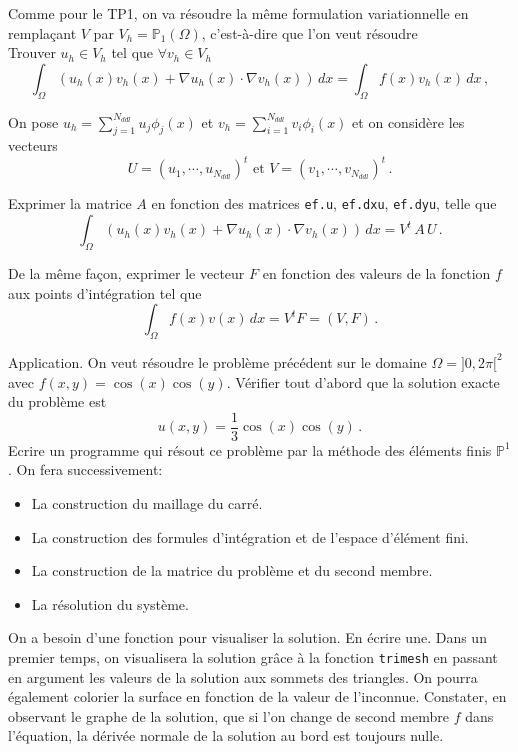 \documentclass[a4paper,french,sumlimits,12pt]{article}
\begin{document}
Comme pour le TP1, on va résoudre la même formulation variationnelle en remplaçant $V$ par $V_h = \mathbb{P}_1(\Omega)$, c'est-à-dire que l'on veut résoudre\\
Trouver $u_h \in V_h$ tel que $\forall v_h \in V_h$
$$
\int_{\Omega} \left(u_h(x)v_h(x)+\nabla u_h(x)\cdot \nabla v_h(x)\right)\,dx = \int_\Omega f(x)v_h(x)\,dx\,,
$$ 

On pose $u_h = \sum_{j=1}^{N_{ddl}} u_j \phi_j(x)$ et $v_h = \sum_{i=1}^{N_{ddl}} v_i \phi_i(x)$ et on considère les vecteurs
$$
U = (u_1,\cdots,u_{N_{ddl}})^t\mbox{ et }V = (v_1,\cdots,v_{N_{ddl}})^t\,.
$$

 Exprimer la matrice $A$ en fonction des matrices {\tt ef.u}, {\tt ef.dxu}, {\tt ef.dyu}, telle que
$$
\int_{\Omega} \left(u_h(x)v_h(x)+\nabla u_h(x)\cdot \nabla v_h(x)\right)\,dx = V^t \,A\,U\,.
$$

 De la même façon, exprimer le vecteur $F$ en fonction des valeurs de la fonction $f$ aux points d'intégration tel que
$$
\int_{\Omega} f(x)v(x)\,dx = V^t F = (V,F)\,.
$$

Application. On veut résoudre le problème précédent sur le domaine $\Omega = ]0,2\pi[^2$ avec $f(x,y) = \cos(x)\cos(y)$. Vérifier tout d'abord que la solution exacte du problème est
$$
u(x,y) = \frac13 \cos(x)\cos(y)\,.
$$
Ecrire un programme qui résout ce problème par la méthode des éléments finis $\mathbb{P}^1$. On fera successivement:
\begin{itemize}
\item La construction du maillage du carré.
\item La construction des formules d'intégration et de l'espace d'élément fini.
\item La construction de la matrice du problème et du second membre.
\item La résolution du système.
\end{itemize}

 On a besoin d'une fonction pour visualiser la solution.
En écrire une. Dans un premier temps, on visualisera la solution grâce à la fonction {\tt trimesh} en passant en argument les valeurs de la solution aux sommets des triangles.
On pourra également colorier la surface en fonction de la valeur de l'inconnue. Constater, en observant le graphe de la solution, que si l'on change de second membre $f$ dans l'équation, la dérivée normale de la solution au bord est toujours nulle.\\
\end{document}
